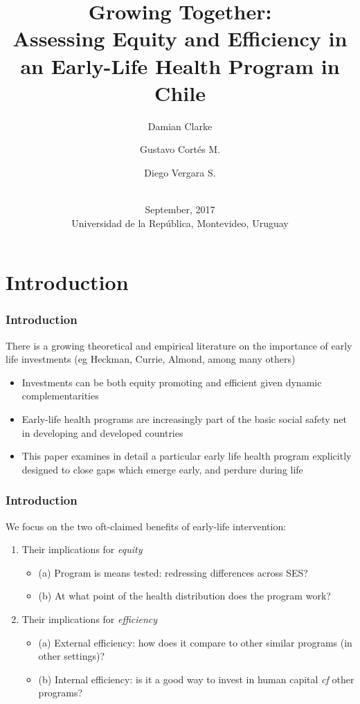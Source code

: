 \documentclass[10pt,letterpaper,subeqn,table]{beamer}
\title{\textbf{Growing Together}: \\ \vspace{2mm}
  \small{Assessing Equity and Efficiency in an Early-Life Health
    Program in Chile}}
\author{Damian Clarke  
   \and Gustavo Cort\'es M.
   \and Diego Vergara S.}
\date{\vspace{2mm} \\ September, 2017  \\ \vspace{2mm}  Universidad de la Rep\'ublica, Montevideo, Uruguay}
\begin{document}
\begin{frame}
\titlepage
\end{frame}

\section{Introduction}
\begin{frame}
\frametitle{Introduction}
There is a growing theoretical and empirical literature on the importance of early
life investments (eg Heckman, Currie, Almond, among many others) \\ \vspace{3mm}
\begin{itemize}
\item Investments can be both equity promoting and efficient given dynamic complementarities
\item Early-life health programs are increasingly part of the basic social safety net in
  developing and developed countries
\item This paper examines in detail a particular early life health program explicitly
  designed to close gaps which emerge early, and perdure during life
\end{itemize}
\end{frame}

\begin{frame}
\frametitle{Introduction}
We focus on the two oft-claimed benefits of early-life intervention:

\begin{enumerate}
\item Their implications for \emph{equity}
  \begin{itemize}
  \item(a) Program is means tested: redressing differences across SES?
  \item(b) At what point of the health distribution does the program work? \vspace{4mm}
  \end{itemize}
\item Their implications for \emph{efficiency}
  \begin{itemize}
  \item(a) External efficiency: how does it compare to other similar programs (in other settings)?
  \item(b) Internal efficiency: is it a good way to invest in human capital \emph{cf} other
    programs?
  \end{itemize}  
\end{enumerate}
\end{frame}
\end{document}

